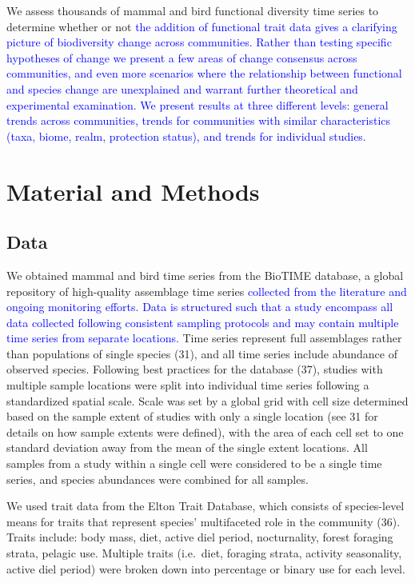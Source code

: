 \documentclass{article}
\begin{document}
We assess thousands of mammal and bird functional diversity time series
to determine whether or not
\textcolor{blue}{the addition of functional trait data gives a clarifying picture of biodiversity change across communities. Rather than testing specific hypotheses of change we present a few areas of change consensus across communities, and even more scenarios where the relationship between functional and species change are unexplained and warrant further theoretical and experimental examination. We present results at three different levels: general trends across communities, trends for communities with similar characteristics (taxa, biome, realm, protection status), and trends for individual studies.}

\hypertarget{material-and-methods}{%
\section{Material and Methods}\label{material-and-methods}}

\hypertarget{data}{%
\subsection{Data}\label{data}}

We obtained mammal and bird time series from the BioTIME database, a
global repository of high-quality assemblage time series
\textcolor{blue}{collected from the literature and ongoing monitoring efforts}.
\textcolor{blue}{Data is structured such that a study encompass all data collected following consistent sampling protocols and may contain multiple time series from separate locations. }
Time series represent full assemblages rather than populations of single
species (31), and all time series include abundance of observed species.
Following best practices for the database (37), studies with multiple
sample locations were split into individual time series following a
standardized spatial scale. Scale was set by a global grid with cell
size determined based on the sample extent of studies with only a single
location (see 31 for details on how sample extents were defined), with
the area of each cell set to one standard deviation away from the mean
of the single extent locations. All samples from a study within a single
cell were considered to be a single time series, and species abundances
were combined for all samples.

We used trait data from the Elton Trait Database, which consists of
species-level means for traits that represent species' multifaceted role
in the community (36). Traits include: body mass, diet, active diel
period, nocturnality, forest foraging strata, pelagic use. Multiple
traits (i.e.~diet, foraging strata, activity seasonality, active diel
period) were broken down into percentage or binary use for each level.
\end{document}
